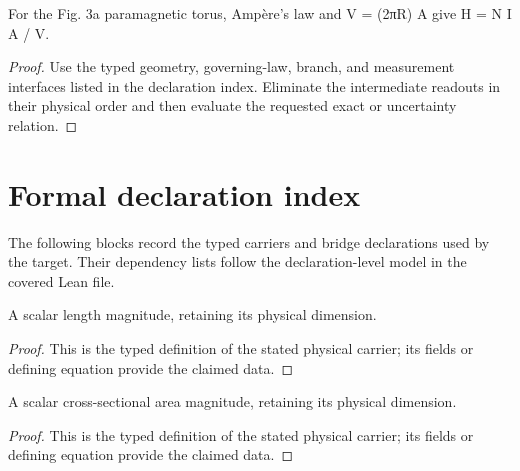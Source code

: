 \begin{theorem}
  \label{thm:physics:IPhO_2026_3_A_1:target}
  For the Fig. 3a paramagnetic torus, Ampère's law and V = (2πR) A give H = N I A / V.
\end{theorem}
\begin{proof}
  Use the typed geometry, governing-law, branch, and measurement interfaces listed in the declaration index.  Eliminate the intermediate readouts in their physical order and then evaluate the requested exact or uncertainty relation.
\end{proof}
\section*{Formal declaration index}
The following blocks record the typed carriers and bridge declarations used by the target.  Their dependency lists follow the declaration-level model in the covered Lean file.

\begin{definition}
  \label{def:physics:IPhO_2026_3_A_1:aux001}
  A scalar length magnitude, retaining its physical dimension.
\end{definition}
\begin{proof}
  This is the typed definition of the stated physical carrier; its fields or defining equation provide the claimed data.
\end{proof}

\begin{definition}
  \label{def:physics:IPhO_2026_3_A_1:aux002}
  A scalar cross-sectional area magnitude, retaining its physical dimension.
\end{definition}
\begin{proof}
  This is the typed definition of the stated physical carrier; its fields or defining equation provide the claimed data.
\end{proof}

